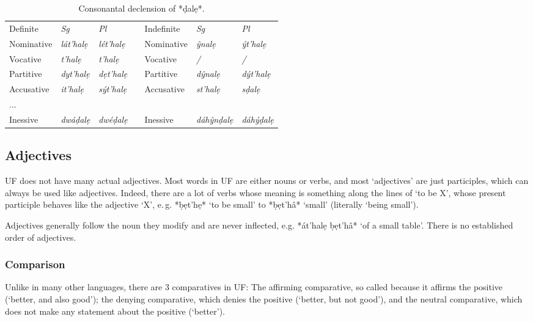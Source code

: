 \documentclass[a4paper, 12pt, oneside, final]{article}
\let \nf \normalfont
\begin{document}
\begin{table}[H]
\centering
\noindent\begin{tabular}{@{}|l|>{\it}l|>{\it}l|l|l|>{\it}l|>{\it}l|}\cline{1-3}\cline{5-7}
Definite    &\nf Sg&\nf Pl && Indefinite&\nf Sg&\nf Pl\\\cline{1-3}\cline{5-7}

Nominative  & lát’halẹ  & lét’halẹ   &&Nominative & ŷnalẹ & ýt’halẹ         \\\cline{1-3}\cline{5-7}
Vocative    & t’halẹ    & t’halẹ    &&Vocative   & / & /                      \\\cline{1-3}\cline{5-7}
Partitive   & dyt’halẹ  & dẹt’halẹ &&Partitive   & dŷnalẹ & dýt’halẹ                     \\\cline{1-3}\cline{5-7}
Accusative  & it’halẹ & sýt’halẹ  &&Accusative & st’halẹ & sḍalẹ                       \\\cline{1-3}\cline{5-7}
...         &  &  &&           & &              \\\cline{1-3}\cline{5-7}
Inessive    & dwáḍalẹ & dwéḍalẹ &&Inessive   & dáhŷnḍalẹ & dáhýḍalẹ                    \\\cline{1-3}\cline{5-7}
\end{tabular}
\caption{Consonantal declension of *ḍalẹ*.}\label{tab:vocalic-declension}
\end{table}

\subsection{Adjectives}
UF does not have many actual adjectives. Most words in UF are either nouns or verbs, and most ‘adjectives’ are just
participles, which can always be used like adjectives. Indeed, there are a lot of verbs whose meaning is something
along the lines of ‘to be X’, whose present participle behaves like the adjective ‘X’, e.\,g. *ḅẹt’hẹ* ‘to be small’
to *ḅẹt’hâ* ‘small’ (literally ‘being small’).

Adjectives generally follow the noun they modify and are never inflected, e.g. *át’halẹ ḅẹt’hâ* ‘of a small table’.
There is no established order of adjectives.

\subsubsection{Comparison}
Unlike in many other languages, there are 3 comparatives in UF: The affirming comparative, so called
because it affirms the positive (‘better, and also good’); the denying comparative, which denies the positive
(‘better, but not good’), and the neutral comparative, which does not make any statement about the positive
(‘better’).
\end{document}
